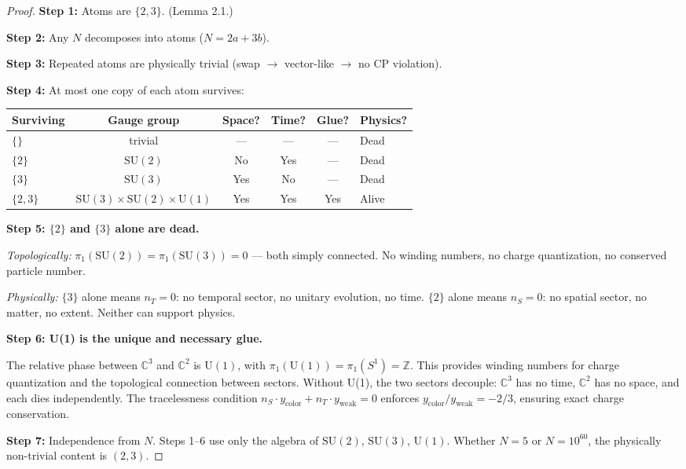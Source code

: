 \documentclass[12pt]{article}
\theoremstyle{remark}
\begin{document}
\begin{proof}
\textbf{Step 1:} Atoms are $\{2, 3\}$. (Lemma 2.1.)

\textbf{Step 2:} Any $N$ decomposes into atoms ($N = 2a + 3b$).

\textbf{Step 3:} Repeated atoms are physically trivial (swap $\to$ vector-like $\to$ no CP violation).

\textbf{Step 4:} At most one copy of each atom survives:

\begin{center}
\begin{tabular}{lccccl}
\hline
Surviving & Gauge group & Space? & Time? & Glue? & Physics? \\
\hline
$\{\}$ & trivial & --- & --- & --- & Dead \\
$\{2\}$ & $\text{SU}(2)$ & No & Yes & --- & Dead \\
$\{3\}$ & $\text{SU}(3)$ & Yes & No & --- & Dead \\
$\{2, 3\}$ & $\text{SU}(3)\!\times\!\text{SU}(2)\!\times\!\text{U}(1)$ & Yes & Yes & Yes & Alive \\
\hline
\end{tabular}
\end{center}

\textbf{Step 5: $\{2\}$ and $\{3\}$ alone are dead.}

\emph{Topologically:} $\pi_1(\text{SU}(2)) = \pi_1(\text{SU}(3)) = 0$ --- both simply connected. No winding numbers, no charge quantization, no conserved particle number.

\emph{Physically:} $\{3\}$ alone means $n_T = 0$: no temporal sector, no unitary evolution, no time. $\{2\}$ alone means $n_S = 0$: no spatial sector, no matter, no extent. Neither can support physics.

\textbf{Step 6: U(1) is the unique and necessary glue.}

The relative phase between $\mathbb{C}^3$ and $\mathbb{C}^2$ is $\text{U}(1)$, with $\pi_1(\text{U}(1)) = \pi_1(S^1) = \mathbb{Z}$. This provides winding numbers for charge quantization and the topological connection between sectors. Without U(1), the two sectors decouple: $\mathbb{C}^3$ has no time, $\mathbb{C}^2$ has no space, and each dies independently. The tracelessness condition $n_S \cdot y_\text{color} + n_T \cdot y_\text{weak} = 0$ enforces $y_\text{color}/y_\text{weak} = -2/3$, ensuring exact charge conservation.

\textbf{Step 7:} Independence from $N$. Steps 1--6 use only the algebra of $\text{SU}(2)$, $\text{SU}(3)$, $\text{U}(1)$. Whether $N = 5$ or $N = 10^{60}$, the physically non-trivial content is $(2, 3)$.
\end{proof}
\end{document}
